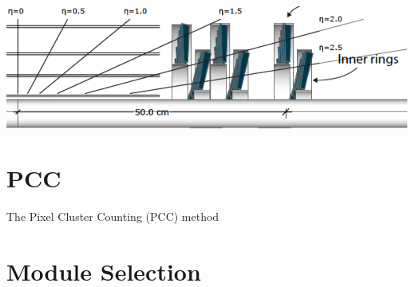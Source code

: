 \includegraphics[scale=0.7]{pixeldetector.png}

\section{PCC}

The Pixel Cluster Counting (PCC) method


\section{Module Selection}



